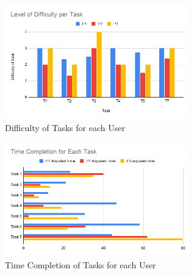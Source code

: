 


\begin{figure}[H]
    \centering
    \includegraphics[width=8cm]{figures/NewFigures/DifficultyTask.png}
    \caption{Difficulty of Tasks for each User}
    \label{fig:DifficultyofTask}
\end{figure}
\begin{figure}[H]
    \centering
    \includegraphics[width=8cm]{figures/NewFigures/AllTime.png}
    \caption{Time Completion of Tasks for each User}
    \label{fig:TimeofTask}
\end{figure}

